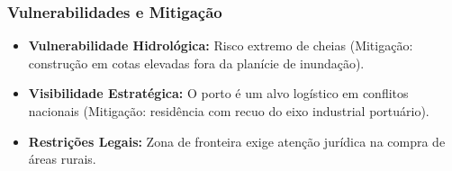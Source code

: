 \subsubsection{Vulnerabilidades e
Mitigação}

\begin{itemize}
\tightlist
\item
  \textbf{Vulnerabilidade Hidrológica:} Risco extremo de cheias
  (Mitigação: construção em cotas elevadas fora da planície de
  inundação).
\item
  \textbf{Visibilidade Estratégica:} O porto é um alvo logístico em
  conflitos nacionais (Mitigação: residência com recuo do eixo
  industrial portuário).
\item
  \textbf{Restrições Legais:} Zona de fronteira exige atenção jurídica
  na compra de áreas rurais.
\end{itemize}

